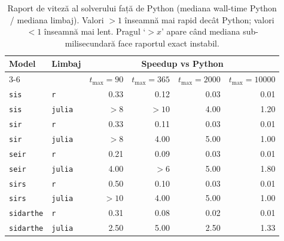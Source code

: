 \begin{table}[!htbp]
\centering
\caption[Speedup solver vs Python]{Raport de viteză al solverului față de Python (mediana wall-time Python / mediana limbaj). Valori $>1$ înseamnă mai rapid decât Python; valori $<1$ înseamnă mai lent. Pragul `$>x$' apare când mediana sub-milisecundară face raportul exact instabil.}
\label{tab:bench_speedup_vs_python}
\small
\begin{tabularx}{\textwidth}{l l rrrr}
\toprule
\textbf{Model} & \textbf{Limbaj} & \multicolumn{4}{c}{\textbf{Speedup vs Python}} \\
\cmidrule(l){3-6}
 & & $t_{\max}=90$ & $t_{\max}=365$ & $t_{\max}=2000$ & $t_{\max}=10000$ \\
\midrule
\texttt{sis} & \texttt{r} & 0.33 & 0.12 & 0.03 & 0.01 \\
\texttt{sis} & \texttt{julia} & $>8$ & $>10$ & 4.00 & 1.20 \\
\midrule
\texttt{sir} & \texttt{r} & 0.33 & 0.11 & 0.03 & 0.01 \\
\texttt{sir} & \texttt{julia} & $>8$ & 4.00 & 5.00 & 1.00 \\
\midrule
\texttt{seir} & \texttt{r} & 0.21 & 0.09 & 0.03 & 0.01 \\
\texttt{seir} & \texttt{julia} & 4.00 & $>6$ & 5.00 & 1.80 \\
\midrule
\texttt{sirs} & \texttt{r} & 0.50 & 0.10 & 0.03 & 0.01 \\
\texttt{sirs} & \texttt{julia} & $>10$ & 4.00 & 5.00 & 1.00 \\
\midrule
\texttt{sidarthe} & \texttt{r} & 0.31 & 0.08 & 0.02 & 0.01 \\
\texttt{sidarthe} & \texttt{julia} & 2.50 & 5.00 & 2.50 & 1.33 \\
\bottomrule
\end{tabularx}
\end{table}
